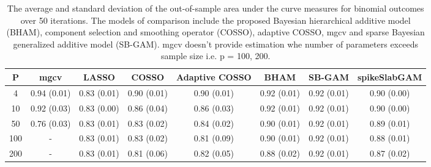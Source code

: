\begin{table}[ht]
\centering
\begin{tabular}{cccccccc}
  \hline
P & mgcv & LASSO & COSSO & Adaptive COSSO & BHAM & SB-GAM & spikeSlabGAM \\ 
  \hline
  4 & 0.94 (0.01) & 0.83 (0.01) & 0.90 (0.01) & 0.90 (0.01) & 0.92 (0.01) & 0.92 (0.01) & 0.90 (0.00) \\ 
   10 & 0.92 (0.03) & 0.83 (0.00) & 0.86 (0.04) & 0.86 (0.03) & 0.92 (0.01) & 0.92 (0.01) & 0.90 (0.00) \\ 
   50 & 0.76 (0.03) & 0.83 (0.01) & 0.83 (0.02) & 0.84 (0.02) & 0.90 (0.01) & 0.92 (0.01) & 0.89 (0.01) \\ 
  100 & - & 0.83 (0.01) & 0.83 (0.02) & 0.81 (0.09) & 0.90 (0.01) & 0.92 (0.01) & 0.88 (0.01) \\ 
  200 & - & 0.83 (0.01) & 0.81 (0.06) & 0.82 (0.05) & 0.88 (0.02) & 0.92 (0.01) & 0.87 (0.02) \\ 
   \hline
\end{tabular}
\caption{The average and standard deviation of the out-of-sample area under the curve measures
    for binomial outcomes over 50 iterations. The models of comparison include the proposed Bayesian
    hierarchical additive model (BHAM), component selection and smoothing operator (COSSO),
    adaptive COSSO, mgcv and sparse Bayesian generalized additive model (SB-GAM). mgcv doesn't provide
    estimation whe number of parameters exceeds sample size i.e. p = 100, 200.} 
\label{tab:bin_auc}
\end{table}
